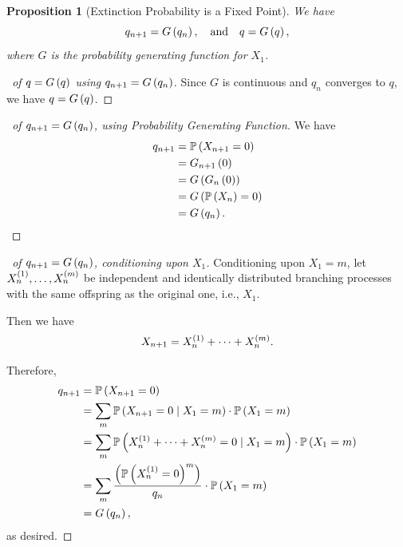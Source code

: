 \documentclass{article}
\newtheorem{proposition}[theorem]{Proposition}
\theoremstyle{definition}
\theoremstyle{remark}
\newcommand{\Prob}{\mathbb{P}}
\newcommand{\Conditional}[2]{#1\mid #2}
\newcommand{\qand}{\quad\text{and}\quad}
\begin{document}
\begin{proposition}[Extinction Probability is a Fixed Point]
    We have
    \[
        q_{n + 1} = G\pqty{q_n}, \qand q = G\pqty{q},
    \]
    where \(G\) is the probability generating function for \(X_1\).
\end{proposition}

\begin{proof}[\proofname\ of \(q = G\left(q\right)\) using \(q_{n + 1} = G\left(q_n\right)\)]
    Since \(G\) is continuous and \(q_n\) converges to \(q\), we have \(q = G\left(q\right)\).
\end{proof}

\begin{proof}[\proofname\ of \(q_{n + 1} = G\left(q_n\right)\), using Probability Generating Function]
    We have
    \begin{align*}
        q_{n + 1} &= \Prob\pqty{X_{n + 1} = 0} \\
        &= G_{n + 1}\pqty{0} \\
        &= G\pqty{G_{n} \pqty{0}} \\
        &= G\pqty{\Prob\pqty{X_n} = 0} \\
        &= G\pqty{q_n}.
    \end{align*}
\end{proof}

\begin{proof}[\proofname\ of \(q_{n + 1} = G\left(q_n\right)\), conditioning upon \(X_1\)]
    Conditioning upon \(X_1 = m\), let \(X_n^{\left(1\right)}, \ldots, X_n^{\left(m\right)}\) be independent and identically distributed branching processes with the same offspring as the original one, i.e., \(X_1\).

    Then we have
    \[
        X_{n + 1} = X_{n}^{\left(1\right)} + \cdots + X_n^{\left(m\right)}.
    \]

    Therefore,
    \begin{align*}
        q_{n + 1} &= \Prob\pqty{X_{n + 1} = 0} \\
        &= \sum_{m} \Prob\pqty{\Conditional{X_{n + 1} = 0}{X_1 = m}} \cdot \Prob\pqty{X_1 = m} \\
        &= \sum_{m} \Prob\pqty{\Conditional{X_n^{\pqty{1}} + \cdots + X_n^{\pqty{m}} = 0}{X_1 = m}} \cdot \Prob\pqty{X_1 = m} \\
        &= \sum_{m} \frac{\pqty{\Prob\pqty{X_n^{\pqty{1}} = 0}^{m}}}{q_n} \cdot \Prob\pqty{X_1 = m} \\
        &= G\pqty{q_n},
    \end{align*}
    as desired.
\end{proof}
\end{document}
